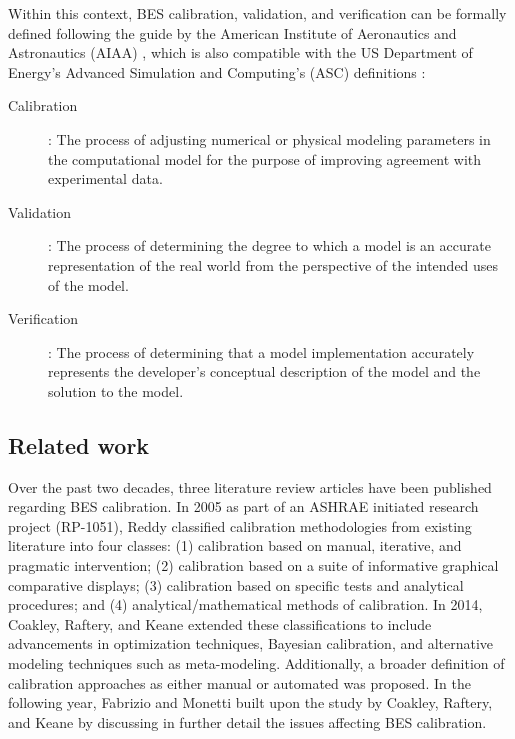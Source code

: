 \documentclass[review]{elsarticle}
\begin{document}
Within this context, BES calibration, validation, and verification can be formally defined following the guide by the American Institute of Aeronautics and Astronautics (AIAA) \cite{american1998aiaa}, which is also compatible with the US Department of Energy’s Advanced Simulation and Computing's (ASC) definitions \cite{trucano2006calibration}:

\begin{description}
    \item[Calibration]: The process of adjusting numerical or physical modeling parameters in the computational model for the purpose of improving agreement with experimental data.
    \item[Validation]: The process of determining the degree to which a model is an accurate representation of the real world from the perspective of the intended uses of the model. 
    \item[Verification]: The process of determining that a model implementation accurately represents the developer's conceptual description of the model and the solution to the model.
\end{description}

\subsection{Related work}
Over the past two decades, three literature review articles \cite{reddy2006literature, coakley2014review, fabrizio2015methodologies} have been published regarding BES calibration. In 2005 as part of an ASHRAE initiated research project (RP-1051), Reddy \cite{reddy2006literature} classified calibration methodologies from existing literature into four classes: (1) calibration based on manual, iterative, and pragmatic intervention; (2) calibration based on a suite of informative graphical comparative displays; (3) calibration based on specific tests and analytical procedures; and (4) analytical/mathematical methods of calibration. In 2014, Coakley, Raftery, and Keane \cite{coakley2014review} extended these classifications to include advancements in optimization techniques, Bayesian calibration, and alternative modeling techniques such as meta-modeling. Additionally, a broader definition of calibration approaches as either manual or automated was proposed. In the following year, Fabrizio and Monetti \cite{fabrizio2015methodologies} built upon the study by Coakley, Raftery, and Keane \cite{coakley2014review} by discussing in further detail the issues affecting BES calibration. 
\end{document}
